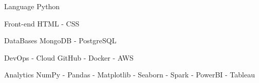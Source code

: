 


\begin{cvskills}


\cvskill
{Language} %
{Python} %


\cvskill
{Front-end} %
{HTML - CSS} %


\cvskill
{DataBases} %
{MongoDB - PostgreSQL} %


\cvskill
{DevOps - Cloud} %
{GitHub - Docker - AWS} %


\cvskill
{Analytics} %
{NumPy - Pandas - Matplotlib - Seaborn - Spark - PowerBI - Tableau} %




\end{cvskills}